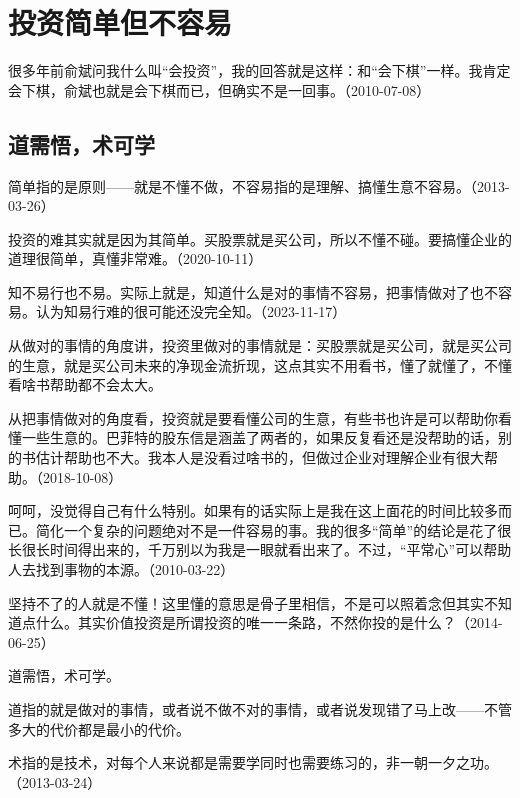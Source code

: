 
\section{投资简单但不容易}

很多年前俞斌问我什么叫“会投资”，我的回答就是这样：和“会下棋”一样。我肯定会下棋，俞斌也就是会下棋而已，但确实不是一回事。（2010-07-08）

\subsection{道需悟，术可学}

简单指的是原则——就是不懂不做，不容易指的是理解、搞懂生意不容易。（2013-03-26）

投资的难其实就是因为其简单。买股票就是买公司，所以不懂不碰。要搞懂企业的道理很简单，真懂非常难。（2020-10-11）

知不易行也不易。实际上就是，知道什么是对的事情不容易，把事情做对了也不容易。认为知易行难的很可能还没完全知。（2023-11-17）

从做对的事情的角度讲，投资里做对的事情就是：买股票就是买公司，就是买公司的生意，就是买公司未来的净现金流折现，这点其实不用看书，懂了就懂了，不懂看啥书帮助都不会太大。

从把事情做对的角度看，投资就是要看懂公司的生意，有些书也许是可以帮助你看懂一些生意的。巴菲特的股东信是涵盖了两者的，如果反复看还是没帮助的话，别的书估计帮助也不大。我本人是没看过啥书的，但做过企业对理解企业有很大帮助。（2018-10-08）


呵呵，没觉得自己有什么特别。如果有的话实际上是我在这上面花的时间比较多而已。简化一个复杂的问题绝对不是一件容易的事。我的很多“简单”的结论是花了很长很长时间得出来的，千万别以为我是一眼就看出来了。不过，“平常心”可以帮助人去找到事物的本源。（2010-03-22）


坚持不了的人就是不懂！这里懂的意思是骨子里相信，不是可以照着念但其实不知道点什么。其实价值投资是所谓投资的唯一一条路，不然你投的是什么？（2014-06-25）

道需悟，术可学。

道指的就是做对的事情，或者说不做不对的事情，或者说发现错了马上改——不管多大的代价都是最小的代价。

术指的是技术，对每个人来说都是需要学同时也需要练习的，非一朝一夕之功。（2013-03-24）

